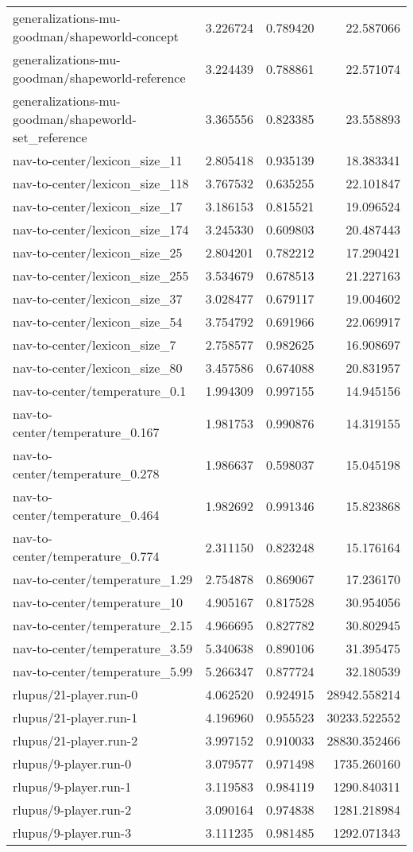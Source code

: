 \begin{tabular}{lrrr}
generalizations-mu-goodman/shapeworld-concept & 3.226724 & 0.789420 & 22.587066 \\
generalizations-mu-goodman/shapeworld-reference & 3.224439 & 0.788861 & 22.571074 \\
generalizations-mu-goodman/shapeworld-set\_reference & 3.365556 & 0.823385 & 23.558893 \\
nav-to-center/lexicon\_size\_11 & 2.805418 & 0.935139 & 18.383341 \\
nav-to-center/lexicon\_size\_118 & 3.767532 & 0.635255 & 22.101847 \\
nav-to-center/lexicon\_size\_17 & 3.186153 & 0.815521 & 19.096524 \\
nav-to-center/lexicon\_size\_174 & 3.245330 & 0.609803 & 20.487443 \\
nav-to-center/lexicon\_size\_25 & 2.804201 & 0.782212 & 17.290421 \\
nav-to-center/lexicon\_size\_255 & 3.534679 & 0.678513 & 21.227163 \\
nav-to-center/lexicon\_size\_37 & 3.028477 & 0.679117 & 19.004602 \\
nav-to-center/lexicon\_size\_54 & 3.754792 & 0.691966 & 22.069917 \\
nav-to-center/lexicon\_size\_7 & 2.758577 & 0.982625 & 16.908697 \\
nav-to-center/lexicon\_size\_80 & 3.457586 & 0.674088 & 20.831957 \\
nav-to-center/temperature\_0.1 & 1.994309 & 0.997155 & 14.945156 \\
nav-to-center/temperature\_0.167 & 1.981753 & 0.990876 & 14.319155 \\
nav-to-center/temperature\_0.278 & 1.986637 & 0.598037 & 15.045198 \\
nav-to-center/temperature\_0.464 & 1.982692 & 0.991346 & 15.823868 \\
nav-to-center/temperature\_0.774 & 2.311150 & 0.823248 & 15.176164 \\
nav-to-center/temperature\_1.29 & 2.754878 & 0.869067 & 17.236170 \\
nav-to-center/temperature\_10 & 4.905167 & 0.817528 & 30.954056 \\
nav-to-center/temperature\_2.15 & 4.966695 & 0.827782 & 30.802945 \\
nav-to-center/temperature\_3.59 & 5.340638 & 0.890106 & 31.395475 \\
nav-to-center/temperature\_5.99 & 5.266347 & 0.877724 & 32.180539 \\
rlupus/21-player.run-0 & 4.062520 & 0.924915 & 28942.558214 \\
rlupus/21-player.run-1 & 4.196960 & 0.955523 & 30233.522552 \\
rlupus/21-player.run-2 & 3.997152 & 0.910033 & 28830.352466 \\
rlupus/9-player.run-0 & 3.079577 & 0.971498 & 1735.260160 \\
rlupus/9-player.run-1 & 3.119583 & 0.984119 & 1290.840311 \\
rlupus/9-player.run-2 & 3.090164 & 0.974838 & 1281.218984 \\
rlupus/9-player.run-3 & 3.111235 & 0.981485 & 1292.071343 \\
\bottomrule
\end{tabular}
